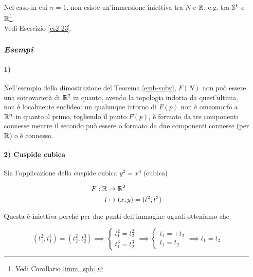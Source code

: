 Nel caso in cui $ n=1 $, non esiste un'immersione iniettiva tra $ N $ e $ \R $, e.g. tra $ \S^{1} $ e $ \R $\footnote{%
	Vedi Corollario \ref{imm_sph}.%
}.\\
Vedi Esercizio \ref{es2-23}.

\subsubsection{\textit{Esempi}}

\paragraph{1)}

Nell'esempio della dimostrazione del Teorema \ref{emb-subv}, $ F(N) $ non può essere una sottovarietà di $ \R^{2} $ in quanto, avendo la topologia indotta da quest'ultima, non è localmente euclideo: un qualunque intorno di $ F(p) $ non è omeomorfo a $ \R^{n} $ in quanto il primo, togliendo il punto $ F(p) $, è formato da tre componenti connesse mentre il secondo può essere o formato da due componenti connesse (per $ \R $) o è connesso.

\paragraph{2) Cuspide cubica}

Sia l'applicazione della cuspide cubica $ y^{2} = x^{3} $ (cubica)

\begin{align}
	\begin{split}
		F : \R &\to \R^{2}\\
		t &\mapsto (x,y) = (t^{2},t^{3})
	\end{split}
\end{align}

Questa è iniettiva perché per due punti dell'immagine uguali otteniamo che

\begin{equation}
	(t_{1}^{2},t_{1}^{3}) = (t_{2}^{2},t_{2}^{3})%
	\implies%
	\begin{cases}
		t_{1}^{2} = t_{2}^{2}\\
		t_{1}^{3} = t_{2}^{3}
	\end{cases}%
	\implies%
	\begin{cases}
		t_{1} = \pm t_{2}\\
		t_{1} = t_{2}
	\end{cases}%
	\implies%
	t_{1} = t_{2}
\end{equation}

